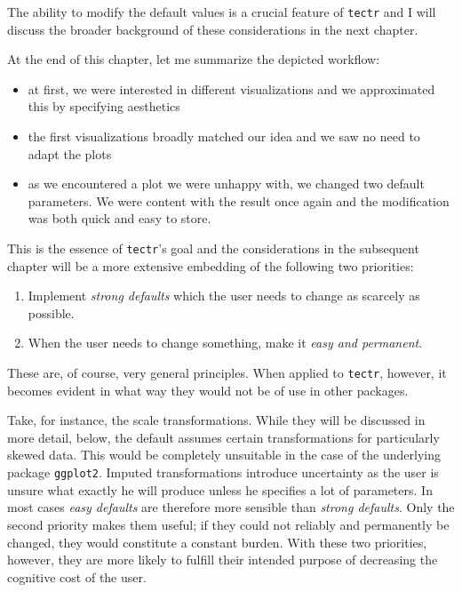 \documentclass[]{report}
\theoremstyle{definition}
\theoremstyle{definition}
\theoremstyle{definition}
\theoremstyle{remark}
\begin{document}
The ability to modify the default values is a crucial feature of
\texttt{tectr} and I will discuss the broader background of these
considerations in the next chapter.

At the end of this chapter, let me summarize the depicted workflow:

\begin{itemize}
\item
  at first, we were interested in different visualizations and we
  approximated this by specifying aesthetics
\item
  the first visualizations broadly matched our idea and we saw no need
  to adapt the plots
\item
  as we encountered a plot we were unhappy with, we changed two default
  parameters. We were content with the result once again and the
  modification was both quick and easy to store.
\end{itemize}

This is the essence of \texttt{tectr}'s goal and the considerations in
the subsequent chapter will be a more extensive embedding of the
following two priorities:

\begin{enumerate}
\def\labelenumi{\arabic{enumi}.}
\item
  Implement \emph{strong defaults} which the user needs to change as
  scarcely as possible.
\item
  When the user needs to change something, make it \emph{easy and
  permanent}.
\end{enumerate}

These are, of course, very general principles. When applied to
\texttt{tectr}, however, it becomes evident in what way they would not
be of use in other packages.

Take, for instance, the scale transformations. While they will be
discussed in more detail, below, the default assumes certain
transformations for particularly skewed data. This would be completely
unsuitable in the case of the underlying package \texttt{ggplot2}.
Imputed transformations introduce uncertainty as the user is unsure what
exactly he will produce unless he specifies a lot of parameters. In most
cases \emph{easy defaults} are therefore more sensible than \emph{strong
defaults}. Only the second priority makes them useful; if they could not
reliably and permanently be changed, they would constitute a constant
burden. With these two priorities, however, they are more likely to
fulfill their intended purpose of decreasing the cognitive cost of the
user.
\end{document}
